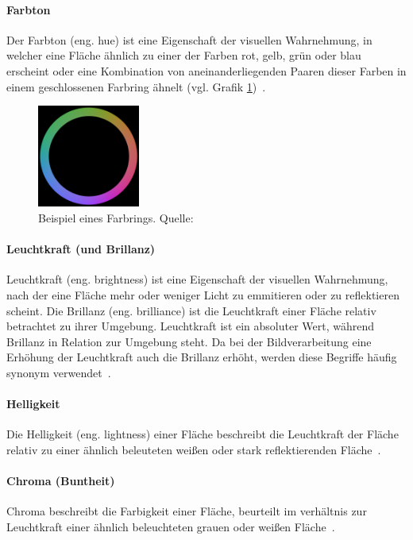\documentclass[12pt, a4paper, ngerman]{article}
\begin{document}
\paragraph{Farbton}
Der Farbton (eng. hue) ist eine Eigenschaft der visuellen Wahrnehmung, in welcher eine Fläche 
ähnlich zu einer der Farben rot, gelb, grün oder blau erscheint oder eine Kombination von 
aneinanderliegenden Paaren dieser Farben in einem geschlossenen Farbring ähnelt (vgl. Grafik \ref{fig:Hue})~\cite{Darktable_2023}. 

\begin{figure}
  \centering
  \includegraphics[width=0.3\textwidth]{Grafiken/Farbring.png}
  \caption{Beispiel eines Farbrings. Quelle: \cite{Hue_2023}}
  \label{fig:Hue}
\end{figure}

\paragraph{Leuchtkraft (und Brillanz)}
Leuchtkraft (eng. brightness) ist eine Eigenschaft der visuellen Wahrnehmung, 
nach der eine Fläche mehr oder weniger Licht zu emmitieren oder zu reflektieren scheint. 
Die Brillanz (eng. brilliance) ist die Leuchtkraft einer Fläche relativ betrachtet zu ihrer Umgebung.
Leuchtkraft ist ein absoluter Wert, während Brillanz in Relation zur Umgebung steht.
Da bei der Bildverarbeitung eine Erhöhung der Leuchtkraft auch die Brillanz erhöht, 
werden diese Begriffe häufig synonym verwendet~\cite{Darktable_2023}.

\paragraph{Helligkeit}
Die Helligkeit (eng. lightness) einer Fläche beschreibt die Leuchtkraft der Fläche 
relativ zu einer ähnlich beleuteten weißen oder stark reflektierenden Fläche~\cite{Darktable_2023}.

\paragraph{Chroma (Buntheit)}
Chroma beschreibt die Farbigkeit einer Fläche, beurteilt im verhältnis zur Leuchtkraft 
einer ähnlich beleuchteten grauen oder weißen Fläche~\cite{Darktable_2023}. 
\end{document}
